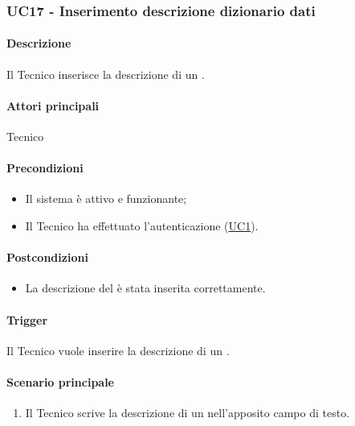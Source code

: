 \subsubsection{UC17 - Inserimento descrizione dizionario dati}\label{UC17}
\paragraph*{Descrizione}
Il Tecnico inserisce la descrizione di un .

\paragraph*{Attori principali}
Tecnico

\paragraph*{Precondizioni}
\begin{itemize}
  \item Il sistema è attivo e funzionante;
  \item Il Tecnico ha effettuato l'autenticazione (\hyperref[UC1]{UC1}).
\end{itemize}

\paragraph*{Postcondizioni}
\begin{itemize}
  \item La descrizione del  è stata inserita correttamente.
\end{itemize}

\paragraph*{Trigger}
Il Tecnico vuole inserire la descrizione di un .

\paragraph*{Scenario principale}
\begin{enumerate}
  \item Il Tecnico scrive la descrizione di un  nell'apposito campo di testo.
\end{enumerate}